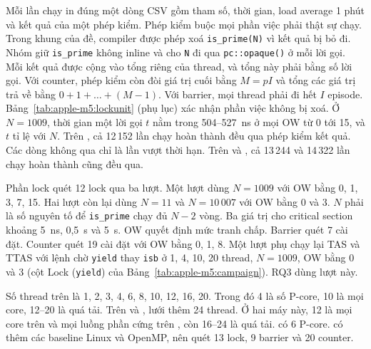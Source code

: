 Mỗi lần chạy in đúng một dòng CSV gồm tham số, thời gian, load average 1 phút và kết quả của một
phép kiểm. Phép kiểm buộc mọi phần việc phải thật sự chạy. Trong khung của đề, compiler được phép xoá
\texttt{is\_prime(N)} vì kết quả bị bỏ đi. Nhóm giữ \texttt{is\_prime} không inline và cho
\texttt{N} đi qua \texttt{pc::opaque()} ở mỗi lời gọi. Mỗi kết quả được cộng vào tổng riêng của
thread, và tổng này phải bằng số lời gọi. Với counter, phép kiểm còn đòi giá trị cuối bằng
$M = pI$ và tổng các giá trị trả về bằng $0 + 1 + \dots + (M-1)$. Với barrier, mọi thread phải đi hết
$I$ episode. Bảng~\ref{tab:apple-m5:lockunit} (phụ lục) xác nhận phần việc không bị xoá. Ở $N=1009$, thời gian
một lời gọi $t$ nằm trong 504--527~ns ở mọi OW từ 0 tới 15, và $t$ tỉ lệ với $N$. Trên
, cả 12\,152 lần chạy hoàn thành đều qua phép kiểm kết quả. Các dòng không qua chỉ
là lần vượt thời hạn. Trên  và , cả 13\,244 và 14\,322 lần
chạy hoàn thành cũng đều qua.

Phần lock quét 12 lock qua ba lượt. Một lượt dùng $N=1009$ với OW bằng 0, 1, 3, 7, 15. Hai lượt
còn lại dùng $N=11$ và $N=10\,007$ với OW bằng 0 và 3. $N$ phải là số nguyên tố để
\texttt{is\_prime} chạy đủ $N-2$ vòng. Ba giá trị cho critical section khoảng 5~ns, 0,5~\textmu s và
5~\textmu s. OW quyết định mức tranh chấp. Barrier quét 7 cài đặt. Counter quét 19 cài đặt với OW bằng
0, 1, 8. Một lượt phụ chạy lại TAS và TTAS với lệnh chờ \texttt{yield} thay \texttt{isb} ở 1, 4, 10,
20 thread, $N=1009$, OW bằng 0 và 3 (cột Lock (\texttt{yield}) của Bảng~\ref{tab:apple-m5:campaign}).
RQ3 dùng lượt này.

Số thread trên  là 1, 2, 3, 4, 6, 8, 10, 12, 16, 20. Trong đó 4 là số P-core, 10 là
mọi core, 12--20 là quá tải. Trên  và , lưới thêm 24 thread. Ở hai
máy này, 12 là mọi core trên  và mọi luồng phần cứng trên , còn
16--24 là quá tải.  có 6 P-core.  có thêm các baseline Linux và
OpenMP, nên quét 13 lock, 9 barrier và 20 counter.

